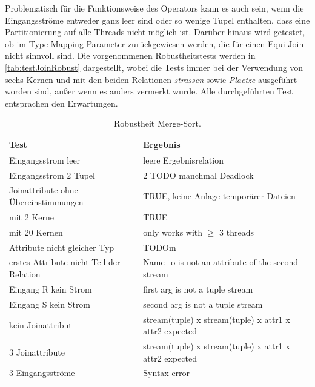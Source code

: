 \documentclass[a4paper,12pt,twoside]{article}
\newcommand{\Fb}[1]{\textit{#1}} %
\begin{document}
Problematisch für die Funktionsweise des Operators kann es auch sein, wenn die Eingangsströme entweder ganz leer sind oder so wenige Tupel enthalten, dass eine Partitionierung auf alle Threads nicht möglich ist. Darüber hinaus wird getestet, ob im Type-Mapping Parameter zurückgewiesen werden, die für einen Equi-Join nicht sinnvoll sind. Die vorgenommenen Robustheitstests werden in \autoref{tab:testJoinRobust} dargestellt, wobei die Tests immer bei der Verwendung von sechs Kernen und mit den beiden Relationen \Fb{strassen} sowie \Fb{Plaetze} ausgeführt worden sind, außer wenn es anders vermerkt wurde. Alle durchgeführten Test entsprachen den Erwartungen.

\begin{table}
	\centering
	\begin{tabular}{|p{7.5cm}|p{7.5cm}|}
		\hline
		\rowcolor{gray!30} 
		Test & Ergebnis \\
		\hline
		Eingangsstrom leer & leere Ergebnisrelation \\ 
		\hline
		Eingangsstrom 2 Tupel & 2 TODO manchmal Deadlock \\ 
		\hline
		Joinattribute ohne Übereinstimmungen & TRUE, keine Anlage temporärer Dateien \\
		\hline
		mit 2 Kerne & TRUE  \\
		\hline
		mit 20 Kernen & only works with $\geq$ 3 threads  \\ 
		\hline
		Attribute nicht gleicher Typ & TODOm \\ 
		\hline
		erstes Attribute nicht Teil der Relation & Name\_o is not an attribute of the second stream \\ 
		\hline
		Eingang R kein Strom & first arg is not a tuple stream \\ 
		\hline
		Eingang S kein Strom & second arg is not a tuple stream \\ 
		\hline
		kein Joinattribut & stream(tuple) x stream(tuple) x attr1 x attr2 expected \\ 
		\hline
		3 Joinattribute & stream(tuple) x stream(tuple) x attr1 x attr2 expected \\
		\hline
		3 Eingangsströme &  Syntax error \\
		\hline
	\end{tabular}
	\caption{\label{tab:testJoinRobust}Robustheit Merge-Sort.}
\end{table}
\end{document}
